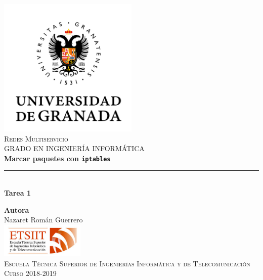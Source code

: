 \documentclass[11pt,a4paper]{article}
\begin{document}
\begin{titlepage}

\begin{minipage}{\textwidth}

\centering
\includegraphics[width=0.5\textwidth]{img/logo.png}\\

\textsc{\Large Redes Multiservicio\\[0.2cm]}
\textsc{GRADO EN INGENIERÍA INFORMÁTICA}\\[1cm]

{\Huge\bfseries Marcar paquetes con \texttt{iptables}\\}
\noindent\rule[-1ex]{\textwidth}{3pt}\\[3.5ex]
{\large\bfseries Tarea 1}
\end{minipage}

\vspace{1.5cm}
\begin{minipage}{\textwidth}
\centering

\textbf{Autora}\\ {Nazaret Román Guerrero}\\[2.5ex]
\includegraphics[width=0.3\textwidth]{img/etsiit.jpeg}\\[0.1cm]
\vspace{1cm}
\textsc{Escuela Técnica Superior de Ingenierías Informática y de Telecomunicación}\\
\vspace{1cm}
\textsc{Curso 2018-2019}
\end{minipage}
\end{titlepage}

\tableofcontents
\thispagestyle{empty}
\end{document}
